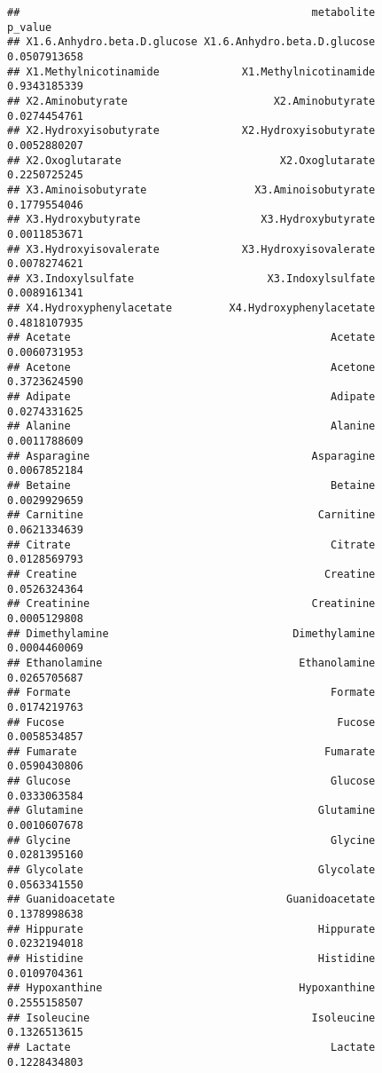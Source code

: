 \documentclass[
]{article}
\begin{document}
\begin{verbatim}
##                                              metabolite      p_value
## X1.6.Anhydro.beta.D.glucose X1.6.Anhydro.beta.D.glucose 0.0507913658
## X1.Methylnicotinamide             X1.Methylnicotinamide 0.9343185339
## X2.Aminobutyrate                       X2.Aminobutyrate 0.0274454761
## X2.Hydroxyisobutyrate             X2.Hydroxyisobutyrate 0.0052880207
## X2.Oxoglutarate                         X2.Oxoglutarate 0.2250725245
## X3.Aminoisobutyrate                 X3.Aminoisobutyrate 0.1779554046
## X3.Hydroxybutyrate                   X3.Hydroxybutyrate 0.0011853671
## X3.Hydroxyisovalerate             X3.Hydroxyisovalerate 0.0078274621
## X3.Indoxylsulfate                     X3.Indoxylsulfate 0.0089161341
## X4.Hydroxyphenylacetate         X4.Hydroxyphenylacetate 0.4818107935
## Acetate                                         Acetate 0.0060731953
## Acetone                                         Acetone 0.3723624590
## Adipate                                         Adipate 0.0274331625
## Alanine                                         Alanine 0.0011788609
## Asparagine                                   Asparagine 0.0067852184
## Betaine                                         Betaine 0.0029929659
## Carnitine                                     Carnitine 0.0621334639
## Citrate                                         Citrate 0.0128569793
## Creatine                                       Creatine 0.0526324364
## Creatinine                                   Creatinine 0.0005129808
## Dimethylamine                             Dimethylamine 0.0004460069
## Ethanolamine                               Ethanolamine 0.0265705687
## Formate                                         Formate 0.0174219763
## Fucose                                           Fucose 0.0058534857
## Fumarate                                       Fumarate 0.0590430806
## Glucose                                         Glucose 0.0333063584
## Glutamine                                     Glutamine 0.0010607678
## Glycine                                         Glycine 0.0281395160
## Glycolate                                     Glycolate 0.0563341550
## Guanidoacetate                           Guanidoacetate 0.1378998638
## Hippurate                                     Hippurate 0.0232194018
## Histidine                                     Histidine 0.0109704361
## Hypoxanthine                               Hypoxanthine 0.2555158507
## Isoleucine                                   Isoleucine 0.1326513615
## Lactate                                         Lactate 0.1228434803

\end{verbatim}
\end{document}
